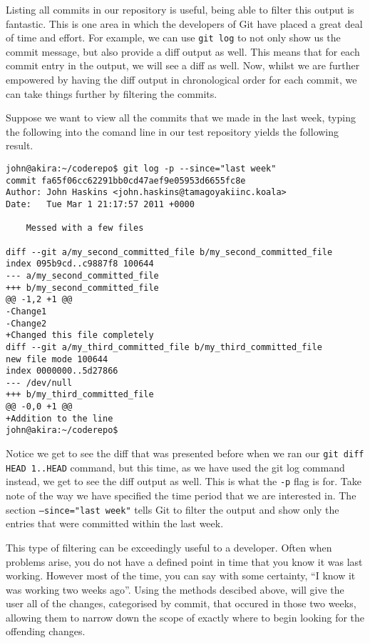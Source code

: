 Listing all commits in our repository is useful, being able to filter this output is fantastic.  This is one area in which the developers of Git have placed a great deal of time and effort.  For example, we can use \texttt{git log} to not only show us the commit message, but also provide a diff output as well.  This means that for each commit entry in the output, we will see a diff as well.  Now, whilst we are further empowered by having the diff output in chronological order for each commit, we can take things further by filtering the commits.  

Suppose we want to view all the commits that we made in the last week, typing the following into the comand line in our test repository yields the following result.

\begin{Verbatim}[frame=leftline,framerule=1mm,fontsize=\relsize{-3}] 
john@akira:~/coderepo$ git log -p --since="last week"
commit fa65f06cc62291bb0cd47aef9e05953d6655fc8e
Author: John Haskins <john.haskins@tamagoyakiinc.koala>
Date:   Tue Mar 1 21:17:57 2011 +0000

    Messed with a few files

diff --git a/my_second_committed_file b/my_second_committed_file
index 095b9cd..c9887f8 100644
--- a/my_second_committed_file
+++ b/my_second_committed_file
@@ -1,2 +1 @@
-Change1
-Change2
+Changed this file completely
diff --git a/my_third_committed_file b/my_third_committed_file
new file mode 100644
index 0000000..5d27866
--- /dev/null
+++ b/my_third_committed_file
@@ -0,0 +1 @@
+Addition to the line
john@akira:~/coderepo$ 
\end{Verbatim}

Notice we get to see the diff that was presented before when we ran our \texttt{git diff HEAD~1..HEAD} command, but this time, as we have used the git log command instead, we get to see the diff output as well.  This is what the \texttt{-p} flag is for.  Take note of the way we have specified the time period that we are interested in.  The section \texttt{--since="last week"} tells Git to filter the output and show only the entries that were committed within the last week.

This type of filtering can be exceedingly useful to a developer.  Often when problems arise, you do not have a defined point in time that you know it was last working.  However most of the time, you can say with some certainty, ``I know it was working two weeks ago''.  Using the methods descibed above, will give the user all of the changes, categorised by commit, that occured in those two weeks, allowing them to narrow down the scope of exactly where to begin looking for the offending changes.

